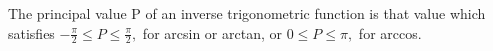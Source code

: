  The principal value P of an inverse trigonometric function is
that value which satisfies $ - \frac{\pi}{2} \leq P \leq \frac{\pi}{2} , $
for arcsin or arctan, or $ 0 \leq P \leq \pi , $ for arccos.
